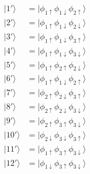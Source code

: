 \documentclass[9pt]{report}
\begin{document}
\begin{align}
|1'\rangle &= |\phi_{1\uparrow}\phi_{1\downarrow}\phi_{2\uparrow}\rangle\\
|2'\rangle &= |\phi_{1\uparrow}\phi_{1\downarrow}\phi_{2\downarrow}\rangle\\
|3'\rangle &= |\phi_{1\uparrow}\phi_{1\downarrow}\phi_{3\uparrow}\rangle\\
|4'\rangle &= |\phi_{1\uparrow}\phi_{1\downarrow}\phi_{3\downarrow}\rangle\\
|5'\rangle &= |\phi_{1\uparrow}\phi_{2\uparrow}\phi_{2\downarrow}\rangle\\
|6'\rangle &= |\phi_{1\uparrow}\phi_{1\downarrow}\phi_{2\uparrow}\rangle\\
|7'\rangle &= |\phi_{2\uparrow}\phi_{2\downarrow}\phi_{3\uparrow}\rangle\\
|8'\rangle &= |\phi_{2\uparrow}\phi_{2\downarrow}\phi_{3\downarrow}\rangle\\
|9'\rangle &= |\phi_{2\uparrow}\phi_{3\uparrow}\phi_{3\downarrow}\rangle\\
|10'\rangle &= |\phi_{2\downarrow}\phi_{3\downarrow}\phi_{3\uparrow}\rangle\\
|11'\rangle &= |\phi_{1\uparrow}\phi_{3\uparrow}\phi_{3\downarrow}\rangle\\
|12'\rangle &= |\phi_{1\downarrow}\phi_{3\uparrow}\phi_{3\downarrow}\rangle\\
\end{align}





\newpage
\end{document}
